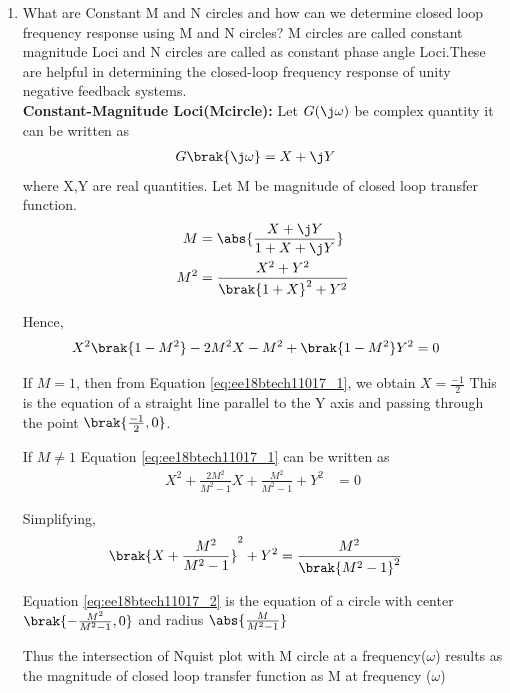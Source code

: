 \begin{enumerate}[label=\thesection.\arabic*.,ref=\thesection.\theenumi]

\item
What are Constant M and N circles and how can we determine closed loop frequency response using M and N circles?
\solution 
M circles are called constant magnitude Loci and N circles are called as
constant phase angle Loci.These are helpful in determining the closed-loop frequency response of unity negative feedback systems. \\

\textbf{Constant-Magnitude Loci(Mcircle):} Let $G(\j\omega)$ be complex quantity it can be written as 
\begin{align}
G\brak{\j \omega} &= X+\j Y
\end{align}
where X,Y are real quantities.
Let M be magnitude of closed loop transfer function.
\begin{align}
M &= \abs{\frac{X+\j Y}{1+X+\j Y}}
\\
M^{2} &= \frac{X^{2}+Y^{2}}{\brak{1+X}^{2}+Y^{2}}
\label{eq:ee18btech11017_3}
\end{align}

Hence,
\begin{align}
X^{2}\brak{1-M^{2}}-2M^{2}X-M^{2}+\brak{1-M^{2}}Y^{2} &= 0
\label{eq:ee18btech11017_1}
\end{align}

If $M=1$, then from Equation \eqref{eq:ee18btech11017_1}, we obtain $X =\frac{-1}{2}$ This is the equation of a straight line parallel to the Y axis and passing through the point $\brak{\frac{-1}{2},0}$.

If $M \neq 1$ Equation \eqref{eq:ee18btech11017_1} can be written as
\begin{align}
X^{2}+\frac{2M^{2}}{M^{2}-1}X+\frac{M^{2}}{M^{2}-1}+Y^{2} &= 0
\end{align}

Simplifying,
\begin{align}
\brak{X+\frac{M^{2}}{M^{2}-1}}^{2}+Y^{2} &= \frac{M^{2}}{\brak{M^{2}-1}^{2}}
\label{eq:ee18btech11017_2}
\end{align}

Equation \eqref{eq:ee18btech11017_2} is the equation of a circle with center 
$\brak{-\frac{M^{2}}{M^{2}-1},0}$ and radius $\abs{\frac{M}{M^{2}-1}}$

Thus the intersection of Nquist plot with M circle at a frequency($\omega$) results as the magnitude of closed loop transfer function as M at frequency ($\omega$)


\end{enumerate}
